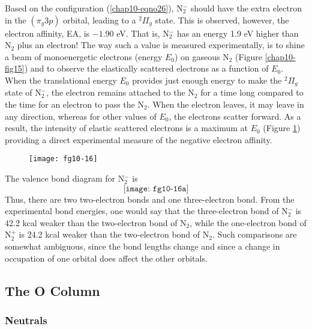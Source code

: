 Based on the configuration (\ref{chap10-eqno26}), N$^-_2$ should have
the extra electron in the $( \pi_g 3p)$ orbital, leading to a
${^2\Pi}_g$ state. This is observed, however, the electron affinity,
EA, is $- 1.90$ eV.  That is, N$^-_2$ has an energy 1.9 eV higher than
N$_2$ plus an electron!  The way such a value is measured
experimentally, is to shine a beam of monoenergetic electrons (energy
$E_0$) on gaseous N$_2$ (Figure \ref{chap10-fig15}) and to observe the
elastically scattered electrons as a function of $E_0$. When the
translational energy $E_0$ provides just enough energy to make the
${^2\Pi}_g$ state of N$^-_2$, the electron remains attached to the
N$_2$ for a time long compared to the time for an electron to pass the
N$_2$.  When the electron leaves, it may leave in any direction,
whereas for other values of $E_0$, the electrons scatter forward.  As
a result, the intensity of elastic scattered electrons is a maximum at
$E_0$ (Figure \ref{chap10-fig16}) providing a direct experimental
measure of the negative electron affinity.

\begin{figure}
\begin{center}
\texttt{[image: fg10-16]}
\end{center}
\caption{}
\label{chap10-fig16}
\end{figure}

The valence bond diagram for N$^-_2$ is
\begin{equation}
\texttt{[image: fg10-16a]}
\end{equation}
Thus, there are two two-electron bonds and one three-electron bond. From 
the experimental bond energies, one would say that the three-electron 
bond of N$^-_2$ is 42.2 kcal weaker than the two-electron bond of 
N$_2$, while 
the one-electron bond of N$^+_2$ is 24.2 kcal weaker than the two-electron 
bond of N$_2$.  Such comparisons 
are somewhat ambiguous, since the bond lengths change and since a change in
occupation of one orbital does affect the other orbitals.

\subsection{The O Column}

\subsubsection{Neutrals}

